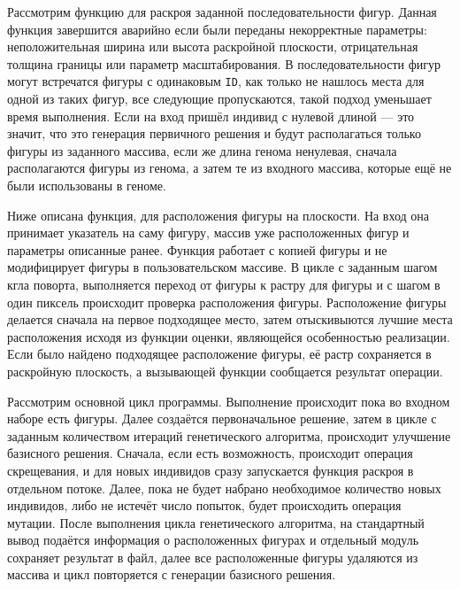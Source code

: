 \documentclass[14pt]{extarticle}
\begin{document}
	Рассмотрим функцию для раскроя заданной последовательности фигур. Данная функция завершится аварийно если были переданы некорректные параметры: неположительная ширина или высота раскройной плоскости, отрицательная толщина границы или параметр масштабирования. В последовательности фигур могут встречатся фигуры с одинаковым \lstinline|ID|, как только не нашлось места для одной из таких фигур, все следующие пропускаются, такой подход уменьшает время выполнения. Если  на вход пришёл индивид с нулевой длиной --- это значит, что это генерация первичного решения и будут располагаться только фигуры из заданного массива, если же длина генома ненулевая, сначала располагаются фигуры из генома, а затем те из входного массива, которые ещё не были использованы в геноме.
	

	
	Ниже описана функция, для расположения фигуры на плоскости. На вход она принимает указатель на саму фигуру, массив уже расположенных фигур и параметры описанные ранее. Функция работает с копией фигуры и не модифицирует фигуры в пользовательском массиве. В цикле с заданным шагом кгла поворта, выполняется переход от фигуры к растру для фигуры и с шагом в один пиксель происходит проверка расположения фигуры. Расположение фигуры делается сначала на первое подходящее место, затем отыскивыются лучшие места расположения исходя из функции оценки, являющейся особенностью реализации. Если было найдено подходящее расположение фигуры, её растр сохраняется в раскройную плоскость, а вызывающей функции сообщается результат операции.
	
	
	Рассмотрим основной цикл программы. Выполнение происходит пока во входном наборе есть фигуры. Далее создаётся первоначальное решение, затем в цикле с заданным количеством итераций генетического алгоритма, происходит улучшение базисного решения. Сначала, если есть возможность, происходит операция скрещевания, и для новых индивидов сразу запускается функция раскроя в отдельном потоке. Далее, пока не будет набрано необходимое количество новых индивидов, либо не истечёт число попыток, будет происходить операция мутации. После выполнения цикла генетического алгоритма, на стандартный вывод подаётся информация о расположенных фигурах и отдельный модуль сохраняет результат в файл, далее все расположенные фигуры удаляются из массива и цикл повторяется с генерации базисного решения.
	
\end{document}
